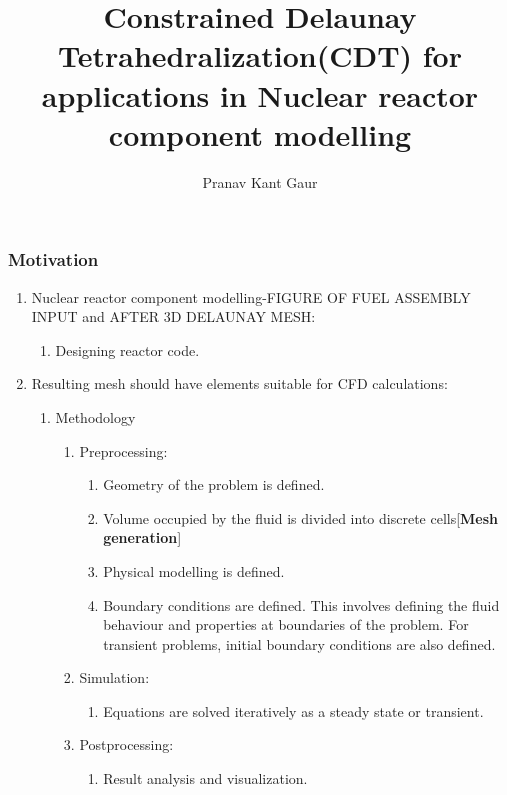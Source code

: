 \documentclass{beamer}
\title[CDT]{Constrained Delaunay Tetrahedralization(CDT) for applications in Nuclear reactor component modelling}
\author{Pranav Kant Gaur}
\institute[BARC, Mumbai]{Computer Division, \newline Bhabha Atomic Research Centre, Mumbai, India}
\date{}
\begin{document}
	\begin{frame}
		\titlepage
	\end{frame}	
	\begin{frame}
	\frametitle{Motivation}
		\begin{enumerate}
			\item Nuclear reactor component modelling-FIGURE OF FUEL ASSEMBLY INPUT and AFTER 3D DELAUNAY MESH:
				\begin{enumerate}
					\item Designing reactor code.	
				\end{enumerate}		
			\item Resulting mesh should have elements suitable for CFD calculations:
				\begin{enumerate}
					\item {Methodology}
						\begin{enumerate}
							\item Preprocessing:
								\begin{enumerate}
									\item Geometry of the problem is defined.
									\item Volume occupied by the fluid is divided into discrete cells[{\textbf{Mesh generation}}]
									\item Physical modelling is defined.
									\item Boundary conditions are defined. This involves defining the fluid behaviour and properties at boundaries of the problem. For transient problems, initial boundary conditions are also defined.	
								\end{enumerate}	
							\item Simulation:
								\begin{enumerate}
									\item Equations are solved iteratively as a steady state or transient.	
								\end{enumerate}		
							\item Postprocessing:
								\begin{enumerate}
									\item Result analysis and visualization.	
								\end{enumerate}	
						\end{enumerate}		
				\end{enumerate}		
			
		\end{enumerate}
	\end{frame}
\end{document}
